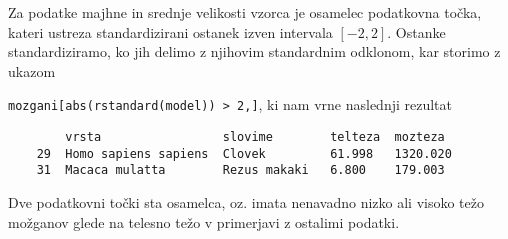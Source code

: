 Za podatke majhne in srednje velikosti vzorca je osamelec podatkovna točka, kateri ustreza standardizirani ostanek
izven intervala $[-2, 2]$.
Ostanke standardiziramo, ko jih delimo z njihovim standardnim odklonom, kar storimo z ukazom

\verb|mozgani[abs(rstandard(model)) > 2,]|, ki nam vrne naslednji rezultat

\begin{verbatim}
        vrsta                 slovime        telteza  mozteza
    29  Homo sapiens sapiens  Clovek         61.998   1320.020
    31  Macaca mulatta        Rezus makaki   6.800    179.003
\end{verbatim}

Dve podatkovni točki sta osamelca, oz. imata nenavadno nizko ali visoko težo možganov glede na telesno težo v
primerjavi z ostalimi podatki.